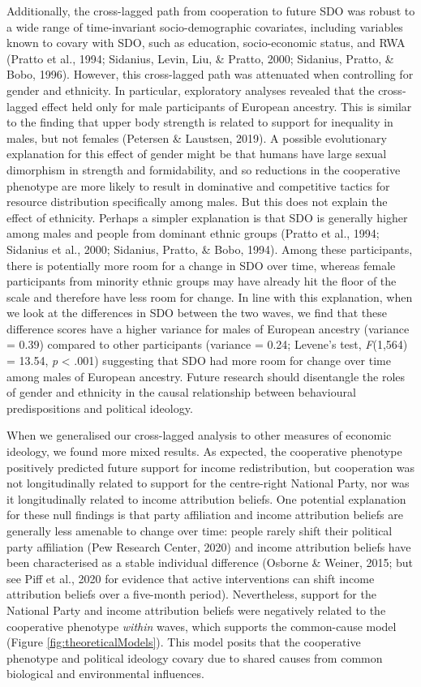 \documentclass[
  man,floatsintext]{apa6}
\begin{document}
Additionally, the cross-lagged path from cooperation to future SDO was robust to a wide range of time-invariant socio-demographic covariates, including variables known to covary with SDO, such as education, socio-economic status, and RWA (Pratto et al., 1994; Sidanius, Levin, Liu, \& Pratto, 2000; Sidanius, Pratto, \& Bobo, 1996). However, this cross-lagged path was attenuated when controlling for gender and ethnicity. In particular, exploratory analyses revealed that the cross-lagged effect held only for male participants of European ancestry. This is similar to the finding that upper body strength is related to support for inequality in males, but not females (Petersen \& Laustsen, 2019). A possible evolutionary explanation for this effect of gender might be that humans have large sexual dimorphism in strength and formidability, and so reductions in the cooperative phenotype are more likely to result in dominative and competitive tactics for resource distribution specifically among males. But this does not explain the effect of ethnicity. Perhaps a simpler explanation is that SDO is generally higher among males and people from dominant ethnic groups (Pratto et al., 1994; Sidanius et al., 2000; Sidanius, Pratto, \& Bobo, 1994). Among these participants, there is potentially more room for a change in SDO over time, whereas female participants from minority ethnic groups may have already hit the floor of the scale and therefore have less room for change. In line with this explanation, when we look at the differences in SDO between the two waves, we find that these difference scores have a higher variance for males of European ancestry (variance = 0.39) compared to other participants (variance = 0.24; Levene's test, \emph{F}(1,564) = 13.54, \emph{p} \textless{} .001) suggesting that SDO had more room for change over time among males of European ancestry. Future research should disentangle the roles of gender and ethnicity in the causal relationship between behavioural predispositions and political ideology.

When we generalised our cross-lagged analysis to other measures of economic ideology, we found more mixed results. As expected, the cooperative phenotype positively predicted future support for income redistribution, but cooperation was not longitudinally related to support for the centre-right National Party, nor was it longitudinally related to income attribution beliefs. One potential explanation for these null findings is that party affiliation and income attribution beliefs are generally less amenable to change over time: people rarely shift their political party affiliation (Pew Research Center, 2020) and income attribution beliefs have been characterised as a stable individual difference (Osborne \& Weiner, 2015; but see Piff et al., 2020 for evidence that active interventions can shift income attribution beliefs over a five-month period). Nevertheless, support for the National Party and income attribution beliefs were negatively related to the cooperative phenotype \emph{within} waves, which supports the common-cause model (Figure \ref{fig:theoreticalModels}). This model posits that the cooperative phenotype and political ideology covary due to shared causes from common biological and environmental influences.
\end{document}

